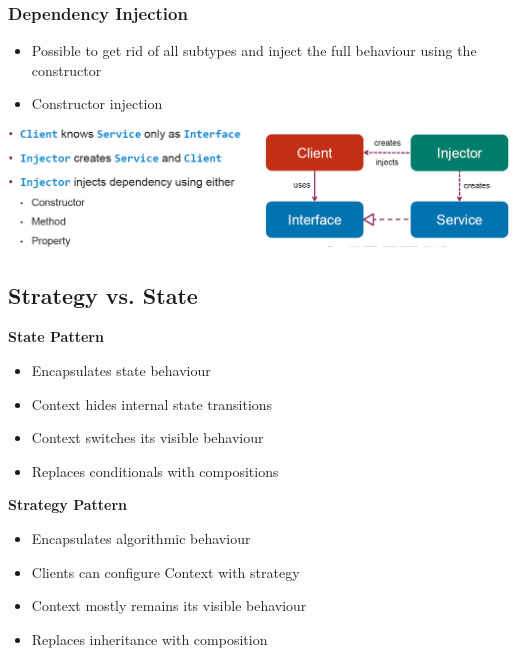 \subsubsection{Dependency Injection}
\begin{itemize}
    \item Possible to get rid of all subtypes and inject the full behaviour using the constructor
    \item Constructor injection
\end{itemize}
\includegraphics[width=\linewidth]{../img/strategy_pattern_DI.png}

\subsection{Strategy vs. State}
\textbf{State Pattern}
\begin{itemize}
    \item Encapsulates state behaviour
    \item Context hides internal state transitions
    \item Context switches its visible behaviour
    \item Replaces conditionals with compositions
\end{itemize}
\textbf{Strategy Pattern}
\begin{itemize}
    \item Encapsulates algorithmic behaviour
    \item Clients can configure Context with strategy
    \item Context mostly remains its visible behaviour
    \item Replaces inheritance with composition
\end{itemize}

